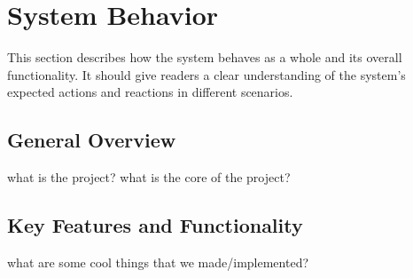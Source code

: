 \section{System Behavior}

This section describes how the system behaves as a whole and its overall functionality. 
It should give readers a clear understanding of the system's expected actions and reactions in different scenarios.

\subsection{General Overview}

what is the project?
what is the core of the project?

\subsection{Key Features and Functionality}

what are some cool things that we made/implemented?